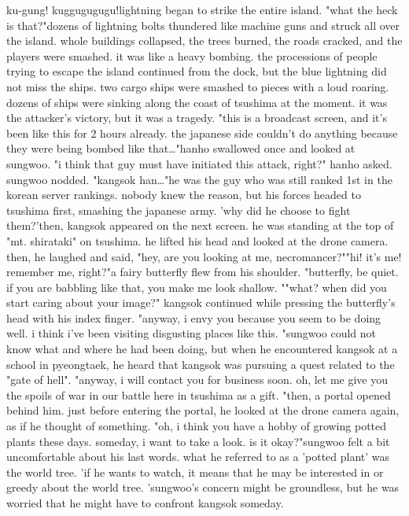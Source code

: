 ku-gung! kuggugugugu!lightning began to strike the entire island.
"what the heck is that?"dozens of lightning bolts thundered like machine guns and struck all over the island.
 whole buildings collapsed, the trees burned, the roads cracked, and the players were smashed.
 it was like a heavy bombing.
the processions of people trying to escape the island continued from the dock, but the blue lightning did not miss the ships.
two cargo ships were smashed to pieces with a loud roaring.
 dozens of ships were sinking along the coast of tsushima at the moment.
it was the attacker's victory, but it was a tragedy.
"this is a broadcast screen, and it's been like this for 2 hours already.
 the japanese side couldn't do anything because they were being bombed like that…"hanho swallowed once and looked at sungwoo.
"i think that guy must have initiated this attack, right?" hanho asked.
sungwoo nodded.
"kangsok han…"he was the guy who was still ranked 1st in the korean server rankings.
 nobody knew the reason, but his forces headed to tsushima first, smashing the japanese army.
'why did he choose to fight them?'then, kangsok appeared on the next screen.
 he was standing at the top of "mt.
 shirataki" on tsushima.
 he lifted his head and looked at the drone camera.
then, he laughed and said, "hey, are you looking at me, necromancer?""hi! it's me! remember me, right?"a fairy butterfly flew from his shoulder.
"butterfly, be quiet.
 if you are babbling like that, you make me look shallow.
""what? when did you start caring about your image?"
kangsok continued while pressing the butterfly's head with his index finger.
"anyway, i envy you because you seem to be doing well.
 i think i've been visiting disgusting places like this.
"sungwoo could not know what and where he had been doing, but when he encountered kangsok at a school in pyeongtaek, he heard that kangsok was pursuing a quest related to the "gate of hell".
"anyway, i will contact you for business soon.
 oh, let me give you the spoils of war in our battle here in tsushima as a gift.
"then, a portal opened behind him.
 just before entering the portal, he looked at the drone camera again, as if he thought of something.
"oh, i think you have a hobby of growing potted plants these days.
 someday, i want to take a look.
 is it okay?"sungwoo felt a bit uncomfortable about his last words.
 what he referred to as a 'potted plant' was the world tree.
'if he wants to watch, it means that he may be interested in or greedy about the world tree.
'sungwoo's concern might be groundless, but he was worried that he might have to confront kangsok someday.
